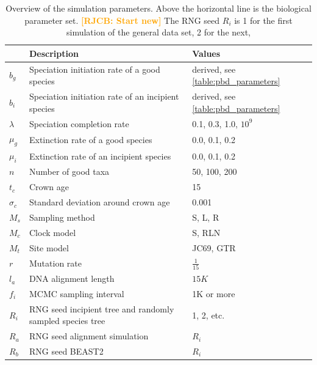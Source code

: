 \documentclass{article}
\newcommand*\richel[1]{\textcolor{orange}{\textbf{[RJCB: #1]}}}
\begin{document}
\begin{table}
  \centering 
  \begin{tabular}{p{} p{} p{}}
    \hline
                          & Description & Values \\
    \hline
    \hline
    $b_g$                 & Speciation initiation rate of a good species & derived, see \ref{table:pbd_parameters} \\
    $b_i$                 & Speciation initiation rate of an incipient species & derived, see \ref{table:pbd_parameters} \\
    $\lambda$             & Speciation completion rate & 0.1, 0.3, 1.0, $10^9$ \\
    $\mu_g$               & Extinction rate of a good species & 0.0, 0.1, 0.2 \\
    $\mu_i$               & Extinction rate of an incipient species & 0.0, 0.1, 0.2 \\
    \hline
    $n$                   & Number of good taxa & 50, 100, 200 \\
    $t_c$                 & Crown age & 15 \\
    $\sigma_c$            & Standard deviation around crown age & 0.001 \\
    $M_s$                 & Sampling method & S, L, R \\
    $M_c$                 & Clock model & S, RLN \\
    $M_t$                 & Site model & JC69, GTR \\
    $r$                   & Mutation rate & $\frac{1}{15}$ \\
    $l_a$                 & DNA alignment length & $15K$ \\
    $f_i$                 & MCMC sampling interval & 1K or more \\
    $R_i$                 & RNG seed incipient tree and randomly sampled species tree & 1, 2, etc. \\
    $R_a$                 & RNG seed alignment simulation & $R_i$ \\
    $R_b$                 & RNG seed BEAST2 & $R_i$ \\
    \hline
  \end{tabular}
  \caption{
    Overview of the simulation parameters. Above the horizontal line is 
    the biological parameter set. 
    \richel{Start new}
    The RNG seed $R_i$ is 1 for the first simulation of the general data set, 2 for the next,
}
\end{table}
\end{document}
